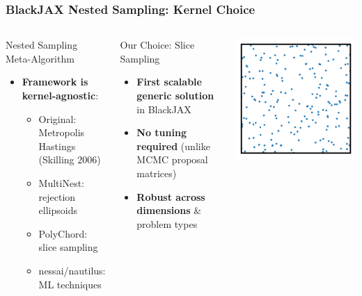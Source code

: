 \documentclass[aspectratio=169]{beamer}
\begin{document}
\begin{frame}
    \frametitle{BlackJAX Nested Sampling: Kernel Choice}
    \begin{columns}
        \begin{block}{Nested Sampling Meta-Algorithm}
            \begin{itemize}
                \item \textbf{Framework is kernel-agnostic}:
                    \begin{itemize}
                        \item Original: Metropolis Hastings (Skilling 2006)
                        \item MultiNest: rejection ellipsoids
                        \item PolyChord: slice sampling
                        \item nessai/nautilus: ML techniques
                    \end{itemize}
            \end{itemize}
        \end{block}
        \begin{block}{Our Choice: Slice Sampling}
            \begin{itemize}
                \item \textbf{First scalable generic solution} in BlackJAX
                \item \textbf{No tuning required} (unlike MCMC proposal matrices)
                \item \textbf{Robust across dimensions} \& problem types
            \end{itemize}
        \end{block}
        \vspace{7pt}   
        \includegraphics[width=\textwidth,page=4]{figures/himmelblau_ns}
    \end{columns}
\end{frame}
\end{document}
